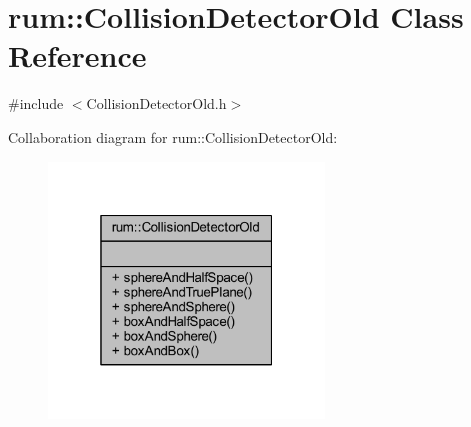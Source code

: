 \hypertarget{classrum_1_1_collision_detector_old}{}\section{rum\+:\+:Collision\+Detector\+Old Class Reference}
\label{classrum_1_1_collision_detector_old}


{\ttfamily \#include $<$Collision\+Detector\+Old.\+h$>$}



Collaboration diagram for rum\+:\+:Collision\+Detector\+Old\+:\nopagebreak
\begin{figure}[H]
\begin{center}
\leavevmode
\includegraphics[width=208pt]{classrum_1_1_collision_detector_old__coll__graph}
\end{center}
\end{figure}
